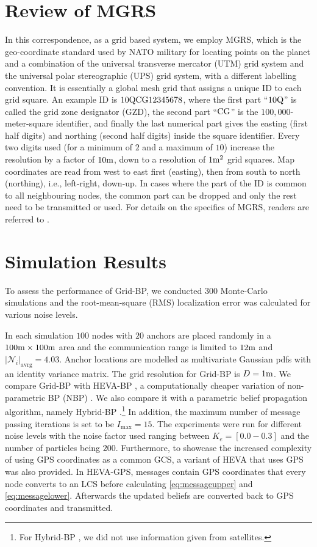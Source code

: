 \documentclass[10pt, final, journal]{IEEEtran}
\begin{document}
\section{Review of MGRS}\label{militarygridreferencesystem}
In this correspondence, as a grid based system, we employ MGRS, which is the geo-coordinate standard used by NATO military for locating points on the planet \cite{ngamgrs} and a combination of the universal transverse mercator (UTM) grid system and the universal polar stereographic (UPS) grid system, with a different labelling convention. It is essentially a global mesh grid that assigns a unique ID to each grid square. An example ID is ${\rm 10QCG12345678}$, where the first part ``${\rm 10Q}$'' is called the grid zone designator (GZD), the second part ``${\rm CG}$'' is the $100,000$-meter-square identifier, and finally the last numerical part gives the easting (first half digits) and northing (second half digits) inside the square identifier. Every two digits used (for a minimum of $2$ and a maximum of $10$) increase the resolution by a factor of $10{\rm m}$, down to a resolution of $1{\rm m}^2$ grid squares. Map coordinates are read from west to east first (easting), then from south to north (northing), i.e., left-right, down-up. In cases where the part of the ID is common to all neighbouring nodes, the common part can be dropped and only the rest need to be transmitted or used. For details on the specifics of MGRS, readers are referred to \cite{ngamgrs}.

\section{Simulation Results}

To assess the performance of Grid-BP, we conducted $300$ Monte-Carlo simulations and the root-mean-square (RMS) localization error was calculated for various noise levels.

In each simulation $100$ nodes with $20$ anchors are placed randomly in a $100{\rm m}\times100{\rm m}$ area and the communication range is limited to $12{\rm m}$ and $|{\mathcal N}_i|_{\text{avrg}}=4.03$. Anchor locations are modelled as multivariate Gaussian pdfs with an identity variance matrix. The grid resolution for Grid-BP is $D=1{\rm m}$. We compare Grid-BP with HEVA-BP \cite{oikonomou2011hybrid}, a computationally cheaper variation of non-parametric BP (NBP) \cite{Ihler:2005be}. We also compare it with a parametric belief propagation algorithm, namely Hybrid-BP \cite{Caceres:2011wx}.\footnote{For Hybrid-BP \cite{Caceres:2011wx}, we did not use information given from satellites.} In addition, the maximum number of message passing iterations is set to be $I_{\text{max}}=15$. The experiments were run for different noise levels with the noise factor used ranging between $K_e=[0.0 - 0.3]$ and the number of particles being $200$. Furthermore, to showcase the increased complexity of using GPS coordinates as a common GCS, a variant of HEVA that uses GPS was also provided. In HEVA-GPS, messages contain GPS coordinates that every node converts to an LCS before calculating \eqref{eq:messageupper} and \eqref{eq:messagelower}. Afterwards the updated beliefs are converted back to GPS coordinates and transmitted.
\end{document}
